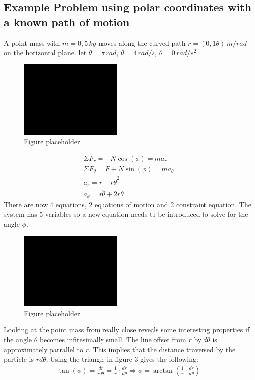 \documentclass[11pt, a4paper]{article}
\begin{document}
\subsection{Example Problem using polar coordinates with a known path of motion}
A point mass with $m = 0,5\,kg$ moves along the curved path $r = (0,1\theta)\,m/rad$ on the horizontal plane.
let $\theta = \pi\,rad$, $\dot{\theta} = 4\,rad/s$, $\ddot{\theta} = 0\,rad/s^2$
\begin{figure}[h]
    \centerline{\includegraphics[width=5cm]{images/placeholder.png}}
    \caption{Figure placeholder}
\end{figure}
\setcounter{equation}{0}
\begin{gather}
    \Sigma F_r = -N\cos(\phi) = ma_r\\
    \Sigma F_\theta = F + N\sin(\phi) = ma_\theta\\
    a_r = \ddot{r} - r\dot{\theta}^2 \\
    a_\theta = r\ddot{\theta} + 2\dot{r}\dot{\theta}
\end{gather}
There are now 4 equations, 2 equations of motion and 2 constraint equation. The system has 5 variables
so a new equation needs to be introduced to solve for the angle $\phi$.
\begin{figure}[h]
    \centerline{\includegraphics[width=5cm]{images/placeholder.png}}
    \caption{Figure placeholder}
\end{figure}
Looking at the point mass from really close reveals some interesting properties if the angle $\theta$ 
becomes infitesimally small. The line offset from $r$ by $d\theta$ is approximately parrallel to $r$.
This implies that the distance traversed by the particle is $rd\theta$. Using the triangle in 
figure 3 gives the following:
\begin{gather}
    \tan(\phi) = \frac{dr}{rd\theta} = \frac{1}{r} \cdot \frac{dr}{d\theta} \Rightarrow
    \phi = \arctan \left( \frac{1}{r} \cdot \frac{dr}{d\theta} \right)
\end{gather}
\end{document}
